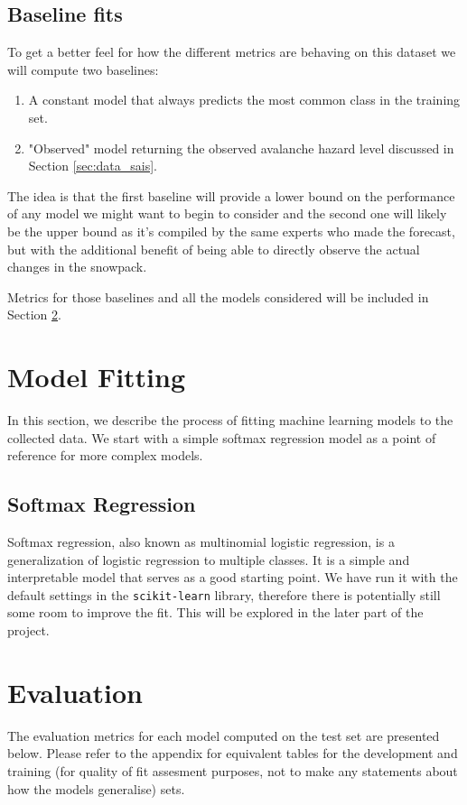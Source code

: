 \documentclass{article}
\begin{document}
\subsection{Baseline fits}

	To get a better feel for how the different metrics are behaving on this dataset we will compute two baselines: 
	\begin{enumerate}
		\item A constant model that always predicts the most common class in the training set.
		\item "Observed" model returning the observed avalanche hazard level discussed in Section \ref{sec:data_sais}.
	\end{enumerate}
	The idea is that the first baseline will provide a lower bound on the performance of any model we might want to begin to consider and the second one will likely be the upper bound as it's compiled by the same experts who made the forecast, but with the additional benefit of being able to directly observe the actual changes in the snowpack.

	Metrics for those baselines and all the models considered will be included in Section \ref{sec:evaluation}.

\section{Model Fitting}

	In this section, we describe the process of fitting machine learning models to the collected data. We start with a simple softmax regression model as a point of reference for more complex models.

\subsection{Softmax Regression}

	Softmax regression, also known as multinomial logistic regression, is a generalization of logistic regression to multiple classes. It is a simple and interpretable model that serves as a good starting point.
	We have run it with the default settings in the \texttt{scikit-learn} library, therefore there is potentially still some room to improve the fit. This will be explored in the later part of the project.

\section{Evaluation}\label{sec:evaluation}
	The evaluation metrics for each model computed on the test set are presented below. Please refer to the appendix for equivalent tables for the development and training (for quality of fit assesment purposes, not to make any statements about how the models generalise) sets.
	
\end{document}

